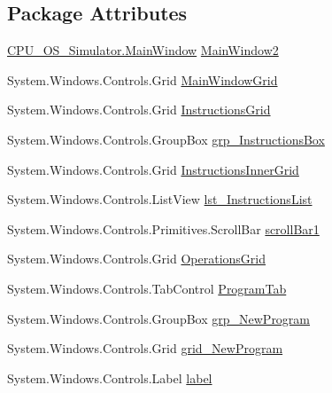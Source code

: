 \subsection*{Package Attributes}
\begin{DoxyCompactItemize}
\item 
\hyperlink{class_c_p_u___o_s___simulator_1_1_main_window}{C\+P\+U\+\_\+\+O\+S\+\_\+\+Simulator.\+Main\+Window} \hyperlink{class_c_p_u___o_s___simulator_1_1_main_window_adf996cda04d3cf426847b8fd8981ee66}{Main\+Window2}
\item 
System.\+Windows.\+Controls.\+Grid \hyperlink{class_c_p_u___o_s___simulator_1_1_main_window_a5c56d82a7b611446e81b7baa3229d76b}{Main\+Window\+Grid}
\item 
System.\+Windows.\+Controls.\+Grid \hyperlink{class_c_p_u___o_s___simulator_1_1_main_window_a2e6841673af413e8a8f8ba8aa0d7c80b}{Instructions\+Grid}
\item 
System.\+Windows.\+Controls.\+Group\+Box \hyperlink{class_c_p_u___o_s___simulator_1_1_main_window_aebc1256b654d001b7c4ce2bc08522667}{grp\+\_\+\+Instructions\+Box}
\item 
System.\+Windows.\+Controls.\+Grid \hyperlink{class_c_p_u___o_s___simulator_1_1_main_window_a94a99eeb7f5fcfcfbdc375937d5439e7}{Instructions\+Inner\+Grid}
\item 
System.\+Windows.\+Controls.\+List\+View \hyperlink{class_c_p_u___o_s___simulator_1_1_main_window_acdab094f589df9435fa8e3bfe04e61cb}{lst\+\_\+\+Instructions\+List}
\item 
System.\+Windows.\+Controls.\+Primitives.\+Scroll\+Bar \hyperlink{class_c_p_u___o_s___simulator_1_1_main_window_a014812a0e9cd159be05250d94d9a5a8b}{scroll\+Bar1}
\item 
System.\+Windows.\+Controls.\+Grid \hyperlink{class_c_p_u___o_s___simulator_1_1_main_window_ae4f2459995eb2f672c0fd3c2248b79fd}{Operations\+Grid}
\item 
System.\+Windows.\+Controls.\+Tab\+Control \hyperlink{class_c_p_u___o_s___simulator_1_1_main_window_a615ea960969aa9a61afdaef8cf039348}{Program\+Tab}
\item 
System.\+Windows.\+Controls.\+Group\+Box \hyperlink{class_c_p_u___o_s___simulator_1_1_main_window_a1e75e7af485b229372a6aafb84c2ffe0}{grp\+\_\+\+New\+Program}
\item 
System.\+Windows.\+Controls.\+Grid \hyperlink{class_c_p_u___o_s___simulator_1_1_main_window_a38bef5fa03edcca52fa7fc11068923bd}{grid\+\_\+\+New\+Program}
\item 
System.\+Windows.\+Controls.\+Label \hyperlink{class_c_p_u___o_s___simulator_1_1_main_window_ad60038602dcf5d954e420bee89c8494d}{label}

\end{DoxyCompactItemize}
